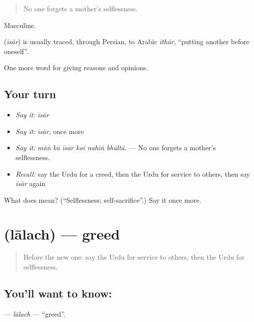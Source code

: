 \begin{quote}
No one forgets a mother's selflessness.
\end{quote}

Masculine.

\begin{cousinweb}
\textbf{} (\emph{īsār}) is usually traced, through Persian, to Arabic \emph{īthār}, \textquotedblleft{}putting another before oneself\textquotedblright{}.
\end{cousinweb}

\begin{grammarlens}[title={What you've built}]
One more word for giving reasons and opinions.
\end{grammarlens}

\subsection*{Your turn}
\begin{itemize}
\raggedright
  \item \emph{Say it:} \emph{īsār}
  \item \emph{Say it:} \emph{īsār}, once more
  \item \emph{Say it:} \emph{māṅ kā īsār koī nahīṅ bhūltā.} — No one forgets a mother's selflessness.
  \item \emph{Recall:} say the Urdu for a creed, then the Urdu for service to others, then say \emph{īsār} again
\end{itemize}

\begin{tcolorbox}[breakable,colback=teal!4,colframe=teal!35!black,title={Before you move on}]
What does  mean? (\textquotedblleft{}Selflessness; self-sacrifice\textquotedblright{}.) Say it once more.
\end{tcolorbox}
\section[\texorpdfstring{\ur{لالچ} (lālach)}{لالچ (lālach)}]{ (lālach) — greed}

\label{lesson:UR-C346-lalach}



\begin{quote}
Before the new one: say the Urdu for service to others, then the Urdu for selflessness.
\end{quote}

\subsection*{You'll want to know: }
\textbf{} — \emph{lālach} — \textquotedblleft{}greed\textquotedblright{}.

